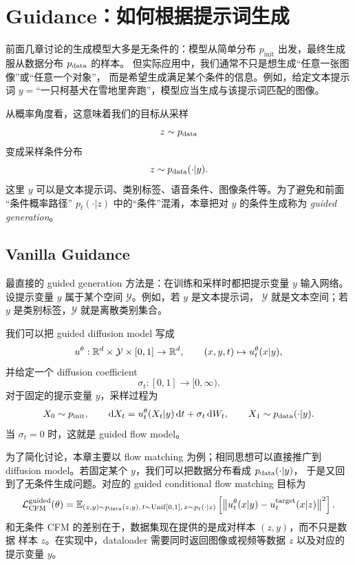 \section{Guidance：如何根据提示词生成}

前面几章讨论的生成模型大多是无条件的：模型从简单分布
$p_{\mathrm{init}}$ 出发，最终生成服从数据分布 $p_{\mathrm{data}}$ 的样本。
但实际应用中，我们通常不只是想生成“任意一张图像”或“任意一个对象”，
而是希望生成满足某个条件的信息。例如，给定文本提示词
$y=$“一只柯基犬在雪地里奔跑”，模型应当生成与该提示词匹配的图像。

从概率角度看，这意味着我们的目标从采样
\begin{equation}
  z\sim p_{\mathrm{data}}
\end{equation}
变成采样条件分布
\begin{equation}
  z\sim p_{\mathrm{data}}(\cdot|y).
\end{equation}
这里 $y$ 可以是文本提示词、类别标签、语音条件、图像条件等。为了避免和前面
“条件概率路径” $p_t(\cdot|z)$ 中的“条件”混淆，本章把对 $y$ 的条件生成称为
\emph{guided generation}。

\subsection{Vanilla Guidance}

最直接的 guided generation 方法是：在训练和采样时都把提示变量 $y$ 输入网络。
设提示变量 $y$ 属于某个空间 $\mathcal{Y}$。例如，若 $y$ 是文本提示词，
$\mathcal{Y}$ 就是文本空间；若 $y$ 是类别标签，$\mathcal{Y}$ 就是离散类别集合。

我们可以把 guided diffusion model 写成
\begin{equation}
  u^\theta:\mathbb{R}^d\times\mathcal{Y}\times[0,1]\to\mathbb{R}^d,
  \qquad
  (x,y,t)\mapsto u_t^\theta(x|y),
\end{equation}
并给定一个 diffusion coefficient
\begin{equation}
  \sigma_t:[0,1]\to[0,\infty).
\end{equation}
对于固定的提示变量 $y$，采样过程为
\begin{equation}
  X_0\sim p_{\mathrm{init}},
  \qquad
  \mathrm{d} X_t=u_t^\theta(X_t|y)\,\mathrm{d} t+\sigma_t\,\mathrm{d} W_t,
  \qquad
  X_1\sim p_{\mathrm{data}}(\cdot|y).
\end{equation}
当 $\sigma_t=0$ 时，这就是 guided flow model。

为了简化讨论，本章主要以 flow matching 为例；相同思想可以直接推广到 diffusion
model。若固定某个 $y$，我们可以把数据分布看成 $p_{\mathrm{data}}(\cdot|y)$，
于是又回到了无条件生成问题。对应的 guided conditional flow matching 目标为
\begin{equation}
  \mathcal{L}^{\mathrm{guided}}_{\mathrm{CFM}}(\theta)
  =
  \mathbb{E}_{(z,y)\sim p_{\mathrm{data}}(z,y),\,t\sim\mathrm{Unif}[0,1],\,x\sim p_t(\cdot|z)}
  \left[
    \left\|
    u_t^\theta(x|y)-u_t^{\mathrm{target}}(x|z)
    \right\|^2
  \right].
\end{equation}
和无条件 CFM 的差别在于，数据集现在提供的是成对样本 $(z,y)$，而不只是数据
样本 $z$。在实现中，dataloader 需要同时返回图像或视频等数据 $z$ 以及对应的
提示变量 $y$。


